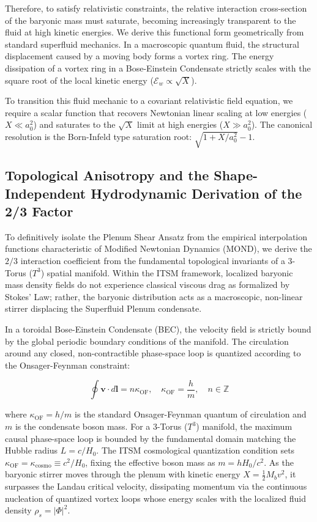\documentclass[aps,prd,10pt,onecolumn,superscriptaddress,nofootinbib]{revtex4-2}
\begin{document}
Therefore, to satisfy relativistic constraints, the relative interaction cross-section of the baryonic mass must saturate, becoming increasingly transparent to the fluid at high kinetic energies. We derive this functional form geometrically from standard superfluid mechanics. In a macroscopic quantum fluid, the structural displacement caused by a moving body forms a vortex ring. The energy dissipation of a vortex ring in a Bose-Einstein Condensate strictly scales with the square root of the local kinetic energy ($\mathcal{E}_w \propto \sqrt{X}$). 

To transition this fluid mechanic to a covariant relativistic field equation, we require a scalar function that recovers Newtonian linear scaling at low energies ($X \ll a_0^2$) and saturates to the $\sqrt{X}$ limit at high energies ($X \gg a_0^2$). The canonical resolution is the Born-Infeld type saturation root: $\sqrt{1+X/a_0^2}-1$.

\subsection{\label{sec:projection}Topological Anisotropy and the Shape-Independent Hydrodynamic Derivation of the 2/3 Factor}

To definitively isolate the Plenum Shear Ansatz from the empirical interpolation functions characteristic of Modified Newtonian Dynamics (MOND), we derive the $2/3$ interaction coefficient from the fundamental topological invariants of a 3-Torus ($T^3$) spatial manifold. Within the ITSM framework, localized baryonic mass density fields do not experience classical viscous drag as formalized by Stokes' Law; rather, the baryonic distribution acts as a macroscopic, non-linear stirrer displacing the Superfluid Plenum condensate.

In a toroidal Bose-Einstein Condensate (BEC), the velocity field is strictly bound by the global periodic boundary conditions of the manifold. The circulation around any closed, non-contractible phase-space loop is quantized according to the Onsager-Feynman constraint:

\begin{equation}
\oint \mathbf{v} \cdot d\mathbf{l} = n \kappa_{\text{OF}}, \quad \kappa_{\text{OF}} = \frac{h}{m}, \quad n \in \mathbb{Z}
\end{equation}

where $\kappa_{\text{OF}} = h/m$ is the standard Onsager-Feynman quantum of circulation and $m$ is the condensate boson mass. For a 3-Torus ($T^3$) manifold, the maximum causal phase-space loop is bounded by the fundamental domain matching the Hubble radius $L = c/H_0$. The ITSM cosmological quantization condition sets $\kappa_{\text{OF}} = \kappa_{\text{cosmo}} \equiv c^2 / H_0$, fixing the effective boson mass as $m = h H_0/c^2$. As the baryonic stirrer moves through the plenum with kinetic energy $X = \frac{1}{2}M_b v^2$, it surpasses the Landau critical velocity, dissipating momentum via the continuous nucleation of quantized vortex loops whose energy scales with the localized fluid density $\rho_s = |\Phi|^2$.
\end{document}
